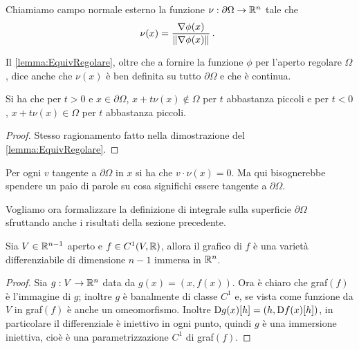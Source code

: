 \begin{definition}
	Chiamiamo campo normale esterno la funzione $\nu:\partial\Omega\rightarrow \mathbb R^n$ tale che
	\[
		\nu(x)=\frac{\nabla \phi(x)}{\lVert\nabla \phi(x)\rVert}\, \text{. }
	\] %
\end{definition}

\begin{remark}
	Il \cref{lemma:EquivRegolare}, oltre che a fornire la funzione $\phi$ per l'aperto regolare $\Omega$, dice anche che $\nu(x)$ è ben definita
	su tutto $\partial \Omega$ e che è continua.
\end{remark}

\begin{remark}
	Si ha che per $t>0$ e $x\in\partial\Omega$, $x+t\nu(x)\notin \Omega$ per $t$ abbastanza piccoli e per $t<0$, $x+t\nu(x)\in \Omega$ per $t$
	abbastanza piccoli.
\end{remark}
\begin{proof}
	Stesso ragionamento fatto nella dimostrazione del \cref{lemma:EquivRegolare}.
\end{proof}

\begin{remark}
	Per ogni $v$ tangente a $\partial\Omega$ in $x$ si ha che $v\cdot\nu(x)=0$. Ma qui bisognerebbe spendere un paio di parole su cosa significhi
	essere tangente a $\partial\Omega$. %
\end{remark}


Vogliamo ora formalizzare la definizione di integrale sulla superficie $\partial\Omega$ sfruttando anche i risultati della sezione precedente.

\begin{lemma}\label{lemma:GrapVar}
	Sia $V\in\mathbb R^{n-1}$ aperto e $f\in C^1(V,\mathbb R)$, allora il grafico di $f$ è una varietà differenziabile di dimensione $n-1$ immersa in $\mathbb R^n$.
\end{lemma}
\begin{proof}
	Sia $g:V\rightarrow \mathbb R^n$ data da $g(x)=(x,f(x))$. Ora è chiaro che graf$(f)$ è l'immagine di $g$; inoltre $g$ è banalmente di classe $C^1$
	e, se vista come funzione da $V$ in graf$(f)$ è anche un omeomorfismo. Inoltre $\mathrm D g(x)[h]=(h,\mathrm D f(x)[h])$, in particolare il differenziale è
	iniettivo in ogni punto, quindi $g$ è una immersione iniettiva, cioè è una parametrizzazione $C^1$ di graf$(f)$.
\end{proof}

